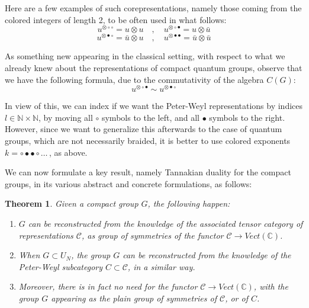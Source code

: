 \documentclass[12pt]{amsbook}
\newtheorem{theorem}{Theorem}[chapter]
\begin{document}
Here are a few examples of such corepresentations, namely those coming from the colored integers of length 2, to be often used in what follows:
$$u^{\otimes\circ\circ}=u\otimes u\quad,\quad 
u^{\otimes\circ\bullet}=u\otimes\bar{u}$$
$$u^{\otimes\bullet\circ}=\bar{u}\otimes u\quad,\quad 
u^{\otimes\bullet\bullet}=\bar{u}\otimes\bar{u}$$

As something new appearing in the classical setting, with respect to what we already knew about the representations of compact quantum groups, observe that we have the following formula, due to the commutativity of the algebra $C(G)$:
$$u^{\otimes\circ\bullet}\sim u^{\otimes\bullet\circ}$$

In view of this, we can index if we want the Peter-Weyl representations by indices $l\in\mathbb N\times\mathbb N$, by moving all $\circ$ symbols to the left, and all $\bullet$ symbols to the right. However, since we want to generalize this afterwards to the case of quantum groups, which are not necessarily braided, it is better to use colored exponents $k=\circ\bullet\bullet\circ\ldots\,$, as above.

\bigskip

We can now formulate a key result, namely Tannakian duality for the compact groups, in its various abstract and concrete formulations, as follows:


\begin{theorem}
Given a compact group $G$, the following happen:
\begin{enumerate}
\item $G$ can be reconstructed from the knowledge of the associated tensor category of representations $\mathcal C$, as group of symmetries of the functor $\mathcal C\to Vect(\mathbb C)$. 

\item When $G\subset U_N$, the group $G$ can be reconstructed from the knowledge of the Peter-Weyl subcategory $C\subset\mathcal C$, in a similar way. 

\item Moreover, there is in fact no need for the functor $\mathcal C\to Vect(\mathbb C)$, with the group $G$ appearing as the plain group of symmetries of $\mathcal C$, or of $C$.
\end{enumerate}
\end{theorem}
\end{document}
